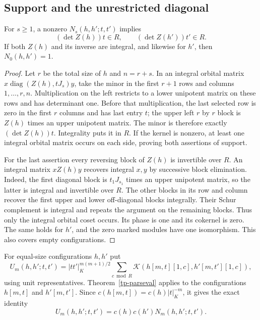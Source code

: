 \subsection{Support and the unrestricted diagonal}

\begin{lemma}\label{tp-minor-support}
For $s\ge1$, a nonzero $N_s(h,h';t,t')$ implies
\[
                 (\det Z(h))t\in R,
                 \qquad(\det Z(h'))t'\in R.
\]
If both $Z(h)$ and its inverse are integral, and likewise for
$h'$, then $N_0(h,h')=1$.
\end{lemma}

\begin{proof}
Let $r$ be the total size of $h$ and $n=r+s$. In an integral
orbital matrix $x\operatorname{diag}(Z(h),tJ_s)y$, take the
minor in the first $r+1$ rows and columns $1,\ldots,r,n$.
Multiplication on the left restricts to a lower unipotent
matrix on these rows and has determinant one. Before that
multiplication, the last selected row is zero in the first $r$
columns and has last entry $t$; the upper left $r$ by $r$
block is $Z(h)$ times an upper unipotent matrix. The minor is
therefore exactly $(\det Z(h))t$. Integrality puts it in $R$.
If the kernel is nonzero, at least one integral orbital matrix
occurs on each side, proving both assertions of support.

For the last assertion every reversing block of $Z(h)$ is
invertible over $R$. An integral matrix $xZ(h)y$ recovers
integral $x,y$ by successive block elimination. Indeed, the
first diagonal block is $t_1J_{s_1}$ times an upper unipotent
matrix, so the latter is integral and invertible over $R$.
The other blocks in its row and column recover the first
upper and lower off-diagonal blocks integrally. Their Schur
complement is integral and repeats the argument on the
remaining blocks. Thus only the integral orbital coset
occurs. Its phase is one and its cokernel is zero. The same
holds for $h'$, and the zero marked modules have one
isomorphism. This also covers empty configurations.
\end{proof}

For equal-size configurations $h,h'$ put
\[
 U_m(h,h';t,t')=|tt'|_K^{m(m+1)/2}
   \sum_{c\bmod R}\mathcal K(h[m,t][1,c],h'[m,t'][1,c]),
\]
using unit representatives. Theorem~\ref{tp-parseval} applies
to the configurations $h[m,t]$ and $h'[m,t']$. Since
$c(h[m,t])=c(h)|t|_K^{-m}$, it gives the exact identity
\begin{equation}\label{tp-unrestricted}
             U_m(h,h';t,t')=c(h)c(h')N_m(h,h';t,t').
\end{equation}

